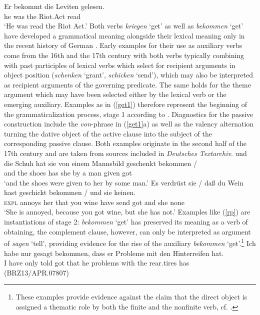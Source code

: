 \documentclass[output=paper
                ,modfonts
                ,nonflat
	        ,collection
	        ,collectionchapter
	        ,collectiontoclongg
 	        ,biblatex
                ,babelshorthands
                ,newtxmath
                ,draftmode
                ,colorlinks, citecolor=brown
]{./langsci/langscibook}
\begin{document}
\ea \label{bek} 
\gll  Er bekommt die Leviten gelesen.  \\  he was the Riot.Act read \\
\glt `He was read the Riot Act.'
\z
Both verbs \textit{kriegen} `get' as well as \textit{bekommen} `get' have developed a grammatical meaning alongside their lexical meaning only in the recent history of German \citep{glaser2005, lenz2012}. Early examples for their use as auxiliary verbs come from the 16th and the 17th century with both verbs typically combining with past participles of lexical verbs which select for recipient arguments in object position (\textit{schenken} `grant', \textit{schicken} `send'), which may also be interpreted as recipient arguments of the governing predicate. The same holds for the theme argument which may have been selected either by the lexical verb or the emerging auxiliary. Examples as in (\ref{get1}) therefore represent the beginning of the grammaticalization process, \ie stage 1 according to \cite[63]{ebert78}. Diagnostics for the passive construction include the \textit{von}-phrase in (\ref{get1}a) as well as the valency alternation turning the dative object of the active clause into the subject of the corresponding passive clause. Both examples originate in the second half of the 17th century and are taken from sources included in \textit{Deutsches Textarchiv}. 
\eal \label{get1}
\ex
\gll und die Schuh hat sie von einem Mannsbild geschenkt bekommen / \\  and the shoes has she by a man given got  \\ 
\glt `and the shoes were given to her by some man.' 
\ex
\gll  Es verdrüst sie / daß du Wein hast geschickt bekommen / und sie keinen.  \\  \textsc{expl} annoys her {} that you wine have send got {} and she none  \\ 
\glt `She is annoyed, because you got wine, but she has not.'
\zl
Examples like (\ref{rp}) are instantiations of stage 2: \textit{bekommen} `get' has preserved its meaning as a verb of obtaining, the complement clause, however, can only be interpreted as argument of \textit{sagen} `tell', providing evidence for the rise of the auxiliary \textit{bekommen} `get'.\footnote{These examples provide evidence against the claim that the direct object is assigned a thematic role by both the finite and the nonfinite verb, cf. \cite{haider1986}.} 
\ea \label{rp} 
\gll  Ich habe nur gesagt bekommen, dass er Probleme mit den Hinterreifen hat.  \\  I have only told got that he problems with the rear.tires has \\ \hfill  (BRZ13/APR.07807)
\end{document}

